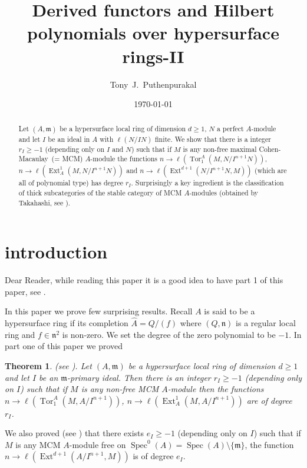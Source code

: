 \documentclass{amsart}
\newcommand{\CM}{Cohen-Macaulay}
\newcommand{\n}{\mathfrak{n} }
\newcommand{\m}{\mathfrak{m} }
\newcommand{\rt}{\rightarrow}
\newcommand{\wh}{\widehat }
\newcommand{\Tor}{\operatorname{Tor}}
\newcommand{\Spec}{\operatorname{Spec}}
\newcommand{\Ext}{\operatorname{Ext}}
\theoremstyle{plain}
\newtheorem{theorem}{Theorem}[section]
\theoremstyle{definition}
\theoremstyle{remark}
\begin{document}
\title[Hilbert polynomials]{Derived functors and Hilbert polynomials over hypersurface rings-II }
\author{Tony~J.~Puthenpurakal}
\date{\today}
\address{Department of Mathematics, IIT Bombay, Powai, Mumbai 400 076}


 \begin{abstract}
Let $(A,\m)$ be a hypersurface local ring of dimension $d \geq 1$, $N$ a perfect $A$-module and let $I$ be an  ideal in $A$ with $\ell(N/IN)$ finite. We show that there is a integer $r_I \geq -1$ (depending only on $I$ and $N$) such that if $M$ is any non-free maximal \CM \ (=  MCM)
$A$-module the  functions $n \rt \ell(\Tor^A_1(M, N/I^{n+1}N))$, $n \rt \ell(\Ext^1_A(M, N/I^{n+1}N))$ and $n \rt \ell(\Ext^{d+1}(N/I^{n+1}N, M))$ (which are all of polynomial type) has degree $r_I$.
Surprisingly a  key ingredient is the classification of thick subcategories of the  stable category of MCM $A$-modules (obtained by Takahashi, see \cite[6.6]{T}).
\end{abstract}
 \maketitle
\section{introduction}
Dear Reader, while reading this paper it is a good idea to have part 1 of this paper, see \cite{P5}.

In this paper we prove  few surprising  results.  Recall $A$ is said to be a hypersurface ring if its completion $\wh{A} = Q/(f)$ where $(Q, \n)$ is a regular local ring and $f \in \n^2$ is non-zero. We set the degree of the zero polynomial to be $-1$. In part one of this paper we proved
\begin{theorem}\label{p1}(see \cite[1.1, 1.2, 1.4]{P5}). Let  $(A,\m)$ be a hypersurface local ring of dimension $d \geq 1$ and let $I$ be an $\m$-primary ideal. Then there is an  integer $r_I \geq -1$ (depending only on $I$) such that if $M$ is any non-free  MCM
$A$-module then the functions $n \rt \ell(\Tor^A_1(M, A/I^{n+1}))$, $n \rt \ell(\Ext^1_A(M, A/I^{n+1}))$ are of degree
$r_I$.
\end{theorem}
We also proved (see \cite[1.3]{P5}) that  there exists $e_I \geq -1$ (depending only on $I$)  such that if $M$ is any MCM $A$-module free on $\Spec^0(A) = \Spec(A) \setminus \{\m \}$, the function $n \rt \ell(\Ext^{d+1}(A/I^{n+1}, M))$
is of degree $e_I$.
\end{document}

